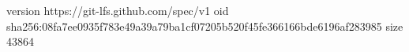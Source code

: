 version https://git-lfs.github.com/spec/v1
oid sha256:08fa7ee0935f783e49a39a79ba1cf07205b520f45fe366166bde6196af283985
size 43864
